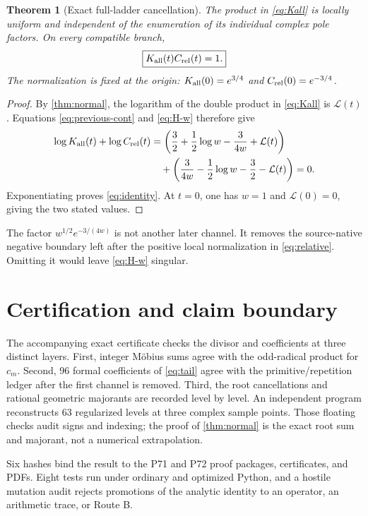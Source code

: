 \documentclass[11pt]{article}
\newtheorem{theorem}{Theorem}[section]
\newcommand{\Crel}{C_{\rm rel}}
\newcommand{\Kall}{K_{\rm all}}
\newcommand{\Lm}{\mathcal L}
\begin{document}
\begin{theorem}[Exact full-ladder cancellation]\label{thm:main}
The product in \eqref{eq:Kall} is locally uniform and independent of the
enumeration of its individual complex pole factors.  On every compatible
branch,
\begin{equation}\label{eq:identity}
 \boxed{\Kall(t)\Crel(t)=1.}
\end{equation}
The normalization is fixed at the origin:
$\Kall(0)=e^{3/4}$ and $\Crel(0)=e^{-3/4}$.
\end{theorem}

\begin{proof}
By \cref{thm:normal}, the logarithm of the double product in
\eqref{eq:Kall} is $\Lm(t)$.  Equations \eqref{eq:previous-cont} and
\eqref{eq:H-w} therefore give
\begin{align*}
 \log\Kall(t)+\log\Crel(t)
 &=\left(\frac32+\frac12\log w-\frac{3}{4w}+\Lm(t)\right)\\
 &\quad+\left(\frac{3}{4w}-\frac12\log w-\frac32-\Lm(t)\right)=0.
\end{align*}
Exponentiating proves \eqref{eq:identity}.  At $t=0$, one has $w=1$ and
$\Lm(0)=0$, giving the two stated values.
\end{proof}

The factor $w^{1/2}e^{-3/(4w)}$ is not another later channel.  It removes the
source-native negative boundary left after the positive local normalization
in \eqref{eq:relative}.  Omitting it would leave \eqref{eq:H-w} singular.

\section{Certification and claim boundary}

The accompanying exact certificate checks the divisor and coefficients at
three distinct layers.  First, integer M\"obius sums agree with the
odd-radical product for $c_m$.  Second, 96 formal coefficients of
\eqref{eq:tail} agree with the primitive/repetition ledger after the first
channel is removed.  Third, the root cancellations and rational geometric
majorants are recorded level by level.  An independent program reconstructs
63 regularized levels at three complex sample points.  Those floating checks
audit signs and indexing; the proof of \cref{thm:normal} is the exact root
sum and majorant, not a numerical extrapolation.

Six hashes bind the result to the P71 and P72 proof packages, certificates,
and PDFs.  Eight tests run under ordinary and optimized Python, and a hostile
mutation audit rejects promotions of the analytic identity to an operator,
an arithmetic trace, or Route B.
\end{document}
